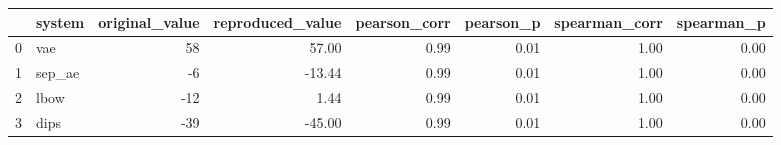 \begin{tabular}{llrrrrrr}
\toprule
 & system & original\_value & reproduced\_value & pearson\_corr & pearson\_p & spearman\_corr & spearman\_p \\
\midrule
0 & vae & 58 & 57.00 & 0.99 & 0.01 & 1.00 & 0.00 \\
1 & sep\_ae & -6 & -13.44 & 0.99 & 0.01 & 1.00 & 0.00 \\
2 & lbow & -12 & 1.44 & 0.99 & 0.01 & 1.00 & 0.00 \\
3 & dips & -39 & -45.00 & 0.99 & 0.01 & 1.00 & 0.00 \\
\bottomrule
\end{tabular}

